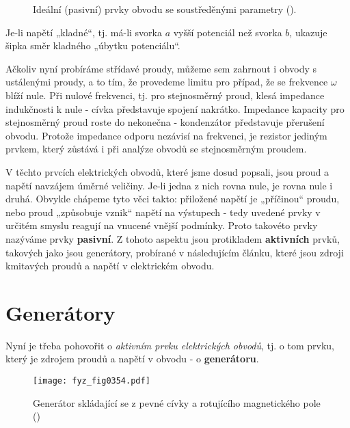   \begin{figure}[hb!] %
    \centering
    \caption{Ideální (pasivní) prvky obvodu se soustředěnými parametry
             (\cite[s.~394]{Feynman02}).}
    \label{fyz:fig0353}
  \end{figure}
  
  Je-li napětí „kladné“, tj. má-li svorka \(a\) vyšší potenciál než svorka \(b\), ukazuje šipka 
  směr kladného „úbytku potenciálu“.
  
  Ačkoliv nyní probíráme střídavé proudy, můžeme sem zahrnout i obvody s ustálenými proudy, a to 
  tím, že provedeme limitu pro případ, že se frekvence \(\omega\) blíží nule. Při nulové frekvenci, 
  tj. pro stejnosměrný proud, klesá impedance indukčnosti k nule - cívka představuje spojení 
  nakrátko. Impedance kapacity pro stejnosměrný proud roste do nekonečna - kondenzátor představuje 
  přerušení obvodu. Protože impedance odporu nezávisí na frekvenci, je rezistor jediným prvkem, 
  který zůstává i při analýze obvodů se stejnosměrným proudem.
  
  V těchto prvcích elektrických obvodů, které jsme dosud popsali, jsou proud a napětí navzájem 
  úměrné veličiny. Je-li jedna z nich rovna nule, je rovna nule i druhá. Obvykle chápeme tyto věci 
  takto: přiložené napětí je „příčinou“ proudu, nebo proud „způsobuje vznik“ napětí na výstupech - 
  tedy uvedené prvky v určitém smyslu reagují na vnucené vnější podmínky. Proto takovéto prvky 
  nazýváme prvky \textbf{pasivní}. Z tohoto aspektu jsou protikladem \textbf{aktivních} prvků, 
  takových jako jsou generátory, probírané v následujícím článku, které jsou zdroji kmitavých 
  proudů a napětí v elektrickém obvodu.

\section{Generátory}\label{fyz:IIchapXXIIsecII}
  Nyní je třeba pohovořit o \emph{aktivním prvku elektrických obvodů}, tj. o tom prvku, který je 
  zdrojem proudů a napětí v obvodu - o \textbf{generátoru}.
  
  \begin{figure}[ht!] %
    \centering
    \texttt{[image: fyz\_fig0354.pdf]}
    \caption{Generátor skládající se z pevné cívky a rotujícího magnetického pole
             (\cite[s.~395]{Feynman02})}
    \label{fyz:fig0354}
  \end{figure}
  
